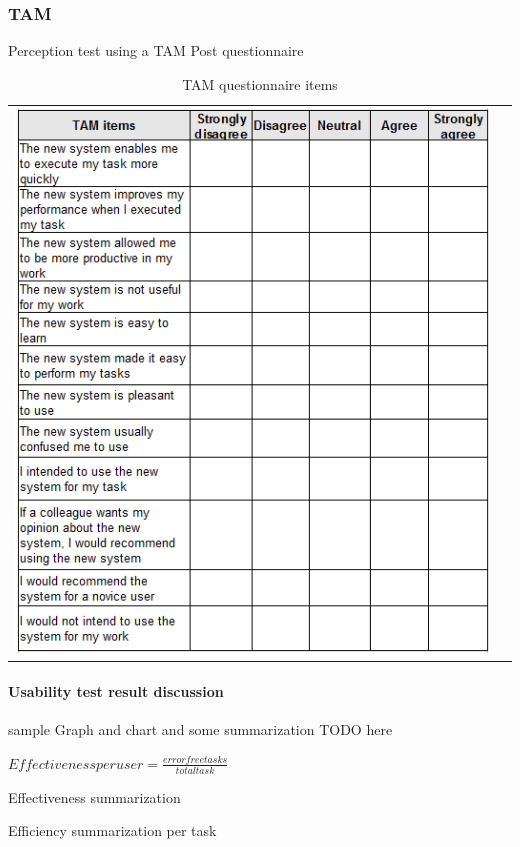 \subsubsection{TAM}
Perception test using a TAM Post questionnaire\cite{tam:doc4}\cite{tam:doc6}


    \begin{table}[htb]

        \caption{TAM questionnaire items}
        \centering
        \begin{tabular}{cc}
        \includegraphics[scale=0.93]{reqspec/tamtable.png}
        \end{tabular}
        \label{tab:tam}

    \end{table}

\paragraph{Usability test result discussion}
sample Graph and chart and some summarization TODO here

$Effectiveness per user=\frac{error free tasks}{total task}$

Effectiveness summarization

Efficiency summarization per task
